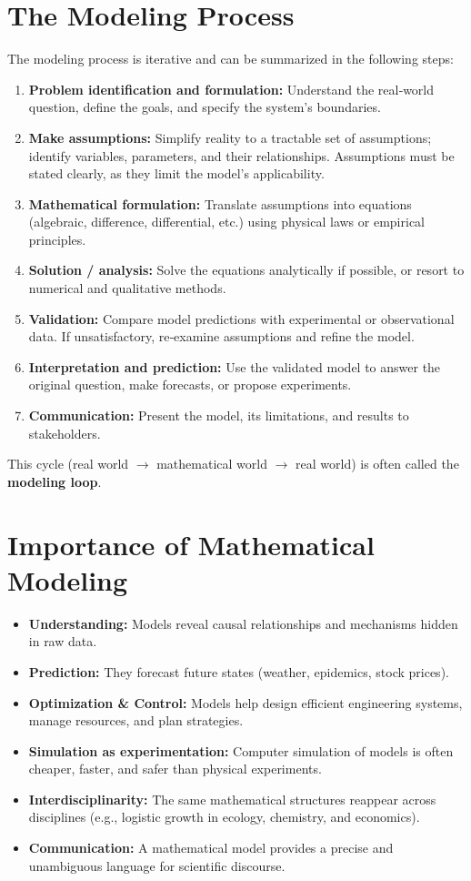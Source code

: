 \documentclass[12pt,a4paper]{book}
\begin{document}
\section{The Modeling Process}
The modeling process is iterative and can be summarized in the following steps:
\begin{enumerate}[leftmargin=*]
    \item \textbf{Problem identification and formulation:} Understand the real‑world question, define the goals, and specify the system’s boundaries.
    \item \textbf{Make assumptions:} Simplify reality to a tractable set of assumptions; identify variables, parameters, and their relationships. Assumptions must be stated clearly, as they limit the model’s applicability.
    \item \textbf{Mathematical formulation:} Translate assumptions into equations (algebraic, difference, differential, etc.) using physical laws or empirical principles.
    \item \textbf{Solution / analysis:} Solve the equations analytically if possible, or resort to numerical and qualitative methods.
    \item \textbf{Validation:} Compare model predictions with experimental or observational data. If unsatisfactory, re‑examine assumptions and refine the model.
    \item \textbf{Interpretation and prediction:} Use the validated model to answer the original question, make forecasts, or propose experiments.
    \item \textbf{Communication:} Present the model, its limitations, and results to stakeholders.
\end{enumerate}
This cycle (real world $\rightarrow$ mathematical world $\rightarrow$ real world) is often called the \textbf{modeling loop}.

\section{Importance of Mathematical Modeling}
\begin{itemize}[leftmargin=*]
    \item \textbf{Understanding:} Models reveal causal relationships and mechanisms hidden in raw data.
    \item \textbf{Prediction:} They forecast future states (weather, epidemics, stock prices).
    \item \textbf{Optimization \& Control:} Models help design efficient engineering systems, manage resources, and plan strategies.
    \item \textbf{Simulation as experimentation:} Computer simulation of models is often cheaper, faster, and safer than physical experiments.
    \item \textbf{Interdisciplinarity:} The same mathematical structures reappear across disciplines (e.g., logistic growth in ecology, chemistry, and economics).
    \item \textbf{Communication:} A mathematical model provides a precise and unambiguous language for scientific discourse.
\end{itemize}
\end{document}
